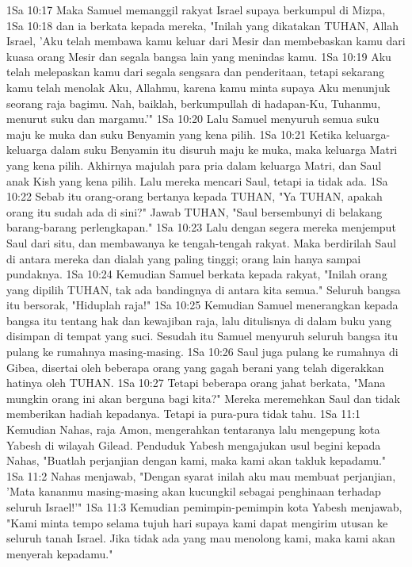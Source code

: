 1Sa 10:17  Maka Samuel memanggil rakyat Israel supaya berkumpul di Mizpa,
1Sa 10:18  dan ia berkata kepada mereka, "Inilah yang dikatakan TUHAN, Allah Israel, 'Aku telah membawa kamu keluar dari Mesir dan membebaskan kamu dari kuasa orang Mesir dan segala bangsa lain yang menindas kamu.
1Sa 10:19  Aku telah melepaskan kamu dari segala sengsara dan penderitaan, tetapi sekarang kamu telah menolak Aku, Allahmu, karena kamu minta supaya Aku menunjuk seorang raja bagimu. Nah, baiklah, berkumpullah di hadapan-Ku, Tuhanmu, menurut suku dan margamu.'"
1Sa 10:20  Lalu Samuel menyuruh semua suku maju ke muka dan suku Benyamin yang kena pilih.
1Sa 10:21  Ketika keluarga-keluarga dalam suku Benyamin itu disuruh maju ke muka, maka keluarga Matri yang kena pilih. Akhirnya majulah para pria dalam keluarga Matri, dan Saul anak Kish yang kena pilih. Lalu mereka mencari Saul, tetapi ia tidak ada.
1Sa 10:22  Sebab itu orang-orang bertanya kepada TUHAN, "Ya TUHAN, apakah orang itu sudah ada di sini?" Jawab TUHAN, "Saul bersembunyi di belakang barang-barang perlengkapan."
1Sa 10:23  Lalu dengan segera mereka menjemput Saul dari situ, dan membawanya ke tengah-tengah rakyat. Maka berdirilah Saul di antara mereka dan dialah yang paling tinggi; orang lain hanya sampai pundaknya.
1Sa 10:24  Kemudian Samuel berkata kepada rakyat, "Inilah orang yang dipilih TUHAN, tak ada bandingnya di antara kita semua." Seluruh bangsa itu bersorak, "Hiduplah raja!"
1Sa 10:25  Kemudian Samuel menerangkan kepada bangsa itu tentang hak dan kewajiban raja, lalu ditulisnya di dalam buku yang disimpan di tempat yang suci. Sesudah itu Samuel menyuruh seluruh bangsa itu pulang ke rumahnya masing-masing.
1Sa 10:26  Saul juga pulang ke rumahnya di Gibea, disertai oleh beberapa orang yang gagah berani yang telah digerakkan hatinya oleh TUHAN.
1Sa 10:27  Tetapi beberapa orang jahat berkata, "Mana mungkin orang ini akan berguna bagi kita?" Mereka meremehkan Saul dan tidak memberikan hadiah kepadanya. Tetapi ia pura-pura tidak tahu.
1Sa 11:1  Kemudian Nahas, raja Amon, mengerahkan tentaranya lalu mengepung kota Yabesh di wilayah Gilead. Penduduk Yabesh mengajukan usul begini kepada Nahas, "Buatlah perjanjian dengan kami, maka kami akan takluk kepadamu."
1Sa 11:2  Nahas menjawab, "Dengan syarat inilah aku mau membuat perjanjian, 'Mata kananmu masing-masing akan kucungkil sebagai penghinaan terhadap seluruh Israel!'"
1Sa 11:3  Kemudian pemimpin-pemimpin kota Yabesh menjawab, "Kami minta tempo selama tujuh hari supaya kami dapat mengirim utusan ke seluruh tanah Israel. Jika tidak ada yang mau menolong kami, maka kami akan menyerah kepadamu."
